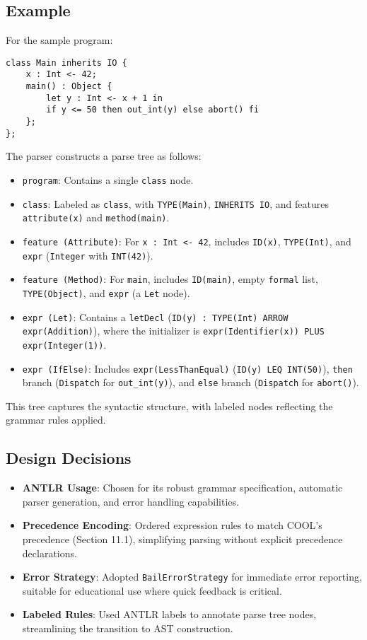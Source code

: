 \documentclass[11pt, titlepage]{article}
\begin{document}
\subsection{Example}
For the sample program:
\begin{lstlisting}
class Main inherits IO {
    x : Int <- 42;
    main() : Object {
        let y : Int <- x + 1 in
        if y <= 50 then out_int(y) else abort() fi
    };
};
\end{lstlisting}
The parser constructs a parse tree as follows:
\begin{itemize}[leftmargin=*]
    \item \texttt{program}: Contains a single \texttt{class} node.
    \item \texttt{class}: Labeled as \texttt{class}, with \texttt{TYPE(Main)}, \texttt{INHERITS IO}, and features \texttt{attribute(x)} and \texttt{method(main)}.
    \item \texttt{feature (Attribute)}: For \texttt{x : Int <- 42}, includes \texttt{ID(x)}, \texttt{TYPE(Int)}, and \texttt{expr} (\texttt{Integer} with \texttt{INT(42)}).
    \item \texttt{feature (Method)}: For \texttt{main}, includes \texttt{ID(main)}, empty \texttt{formal} list, \texttt{TYPE(Object)}, and \texttt{expr} (a \texttt{Let} node).
    \item \texttt{expr (Let)}: Contains a \texttt{letDecl} (\texttt{ID(y) : TYPE(Int) ARROW expr(Addition)}), where the initializer is \texttt{expr(Identifier(x)) PLUS expr(Integer(1))}.
    \item \texttt{expr (IfElse)}: Includes \texttt{expr(LessThanEqual)} (\texttt{ID(y) LEQ INT(50)}), \texttt{then} branch (\texttt{Dispatch} for \texttt{out\_int(y)}), and \texttt{else} branch (\texttt{Dispatch} for \texttt{abort()}).
\end{itemize}
This tree captures the syntactic structure, with labeled nodes reflecting the grammar rules applied.

\subsection{Design Decisions}
\begin{itemize}[leftmargin=*]
    \item \textbf{ANTLR Usage}: Chosen for its robust grammar specification, automatic parser generation, and error handling capabilities.
    \item \textbf{Precedence Encoding}: Ordered expression rules to match COOL's precedence (Section 11.1), simplifying parsing without explicit precedence declarations.
    \item \textbf{Error Strategy}: Adopted \texttt{BailErrorStrategy} for immediate error reporting, suitable for educational use where quick feedback is critical.
    \item \textbf{Labeled Rules}: Used ANTLR labels to annotate parse tree nodes, streamlining the transition to AST construction.
\end{itemize}
\end{document}
